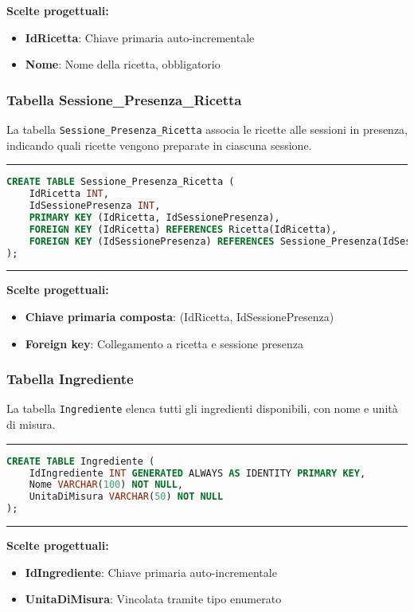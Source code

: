 \textbf{Scelte progettuali:}
\begin{itemize}
    \item \textbf{IdRicetta}: Chiave primaria auto-incrementale
    \item \textbf{Nome}: Nome della ricetta, obbligatorio
\end{itemize}

\subsubsection{Tabella Sessione\_Presenza\_Ricetta}

La tabella \texttt{Sessione\_Presenza\_Ricetta} associa le ricette alle sessioni in presenza, indicando quali ricette vengono preparate in ciascuna sessione.

\noindent\rule{\textwidth}{0.4pt}
\begin{lstlisting}[language=SQL, style=sqlstyle]
CREATE TABLE Sessione_Presenza_Ricetta (
    IdRicetta INT,
    IdSessionePresenza INT,
    PRIMARY KEY (IdRicetta, IdSessionePresenza),
    FOREIGN KEY (IdRicetta) REFERENCES Ricetta(IdRicetta),
    FOREIGN KEY (IdSessionePresenza) REFERENCES Sessione_Presenza(IdSessionePresenza)
);
\end{lstlisting}
\noindent\rule{\textwidth}{0.4pt}

\textbf{Scelte progettuali:}
\begin{itemize}
    \item \textbf{Chiave primaria composta}: (IdRicetta, IdSessionePresenza)
    \item \textbf{Foreign key}: Collegamento a ricetta e sessione presenza
\end{itemize}

\subsubsection{Tabella Ingrediente}

La tabella \texttt{Ingrediente} elenca tutti gli ingredienti disponibili, con nome e unità di misura.

\noindent\rule{\textwidth}{0.4pt}
\begin{lstlisting}[language=SQL, style=sqlstyle]
CREATE TABLE Ingrediente (
    IdIngrediente INT GENERATED ALWAYS AS IDENTITY PRIMARY KEY,
    Nome VARCHAR(100) NOT NULL,
    UnitaDiMisura VARCHAR(50) NOT NULL
);
\end{lstlisting}
\noindent\rule{\textwidth}{0.4pt}

\textbf{Scelte progettuali:}
\begin{itemize}
    \item \textbf{IdIngrediente}: Chiave primaria auto-incrementale
    \item \textbf{UnitaDiMisura}: Vincolata tramite tipo enumerato
\end{itemize}

